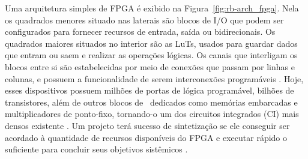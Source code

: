         Uma arquitetura simples de FPGA é exibido na Figura~\ref{fig:rb-arch_fpga}. 
        Nela os quadrados menores situado nas laterais são blocos de I/O que podem ser configurados para fornecer recursos de entrada, saída ou bidirecionais.
        Os quadrados maiores situados no interior são as LuTs, usados para guardar dados que entram ou saem e realizar as operações lógicas.
        Os canais que interligam os blocos entre si são estabelecidas por meio de conexões que passam por linhas e colunas, e possuem a funcionalidade de serem interconexões programáveis \citep{tocci2003sistemas}.
        Hoje, esses dispositivos possuem milhões de portas de lógica programável, bilhões de transistores, além de outros blocos de \hardware\ dedicados como memórias embarcadas e multiplicadores de ponto-fixo, tornando-o um dos circuitos integrados (CI) mais densos existente \citep{Choi2016}.
        Um projeto terá sucesso de sintetização se ele conseguir ser acordado à quantidade de recursos disponíveis do FPGA e executar rápido o suficiente para concluir seus objetivos sistêmicos \cite{coffman1999real}.
    

        
